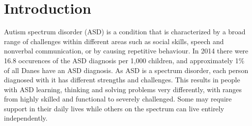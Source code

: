 \chapter{Introduction}
Autism spectrum disorder (ASD) is a condition that is characterized by a broad range of challenges within different areas such as social skills, speech and nonverbal communication, or by causing repetitive behaviour.
In 2014 there were 16.8 occurences of the ASD diagnosis per 1,000 children, and approximately 1\% of all Danes have an ASD diagnosis\autocite{cdcdata}. 
As ASD is a spectrum disorder, each person diagnosed with it has different strengths and challenges.
This results in people with ASD learning, thinking and solving problems very differently, with ranges from highly skilled and functional to severely challenged. 
Some may require support in their daily lives while others on the spectrum can live entirely independently\autocite{autismspeaks}.





